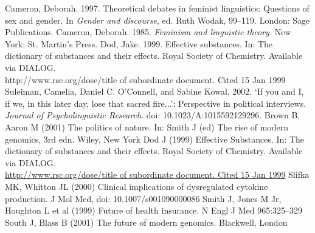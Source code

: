 \begin{thebibliography}{99.}
%
 Cameron, Deborah. 1997. Theoretical debates in feminist linguistics: Questions of sex and gender. In \textit{Gender and discourse}, ed. Ruth Wodak, 99--119. London: Sage Publications.
%
 Cameron, Deborah. 1985. \textit{Feminism and linguistic theory.} New York: St. Martin's Press.
%
 Dod, Jake. 1999. Effective substances. In: The dictionary of substances and their effects. Royal Society of Chemistry. Available via DIALOG. \\
http://www.rsc.org/dose/title of subordinate document. Cited 15 Jan 1999
%
 Suleiman, Camelia, Daniel C. O'Connell, and Sabine Kowal. 2002. `If you and I, if we, in this later day, lose that sacred fire...': Perspective in political interviews. \textit{Journal of Psycholinguistic Research}. doi: 10.1023/A:1015592129296.
%
%
%
\bigskip
%
%
%
%
 Brown B, Aaron M (2001) The politics of nature. In: Smith J (ed) The rise of modern genomics, 3rd edn. Wiley, New York 
%
 Dod J (1999) Effective Substances. In: The dictionary of substances and their effects. Royal Society of Chemistry. Available via DIALOG. \\
\url{http://www.rsc.org/dose/title of subordinate document. Cited 15 Jan 1999}
%
 Slifka MK, Whitton JL (2000) Clinical implications of dysregulated cytokine production. J Mol Med, doi: 10.1007/s001090000086
%
 Smith J, Jones M Jr, Houghton L et al (1999) Future of health insurance. N Engl J Med 965:325--329
%
 South J, Blass B (2001) The future of modern genomics. Blackwell, London 
%
\end{thebibliography}
